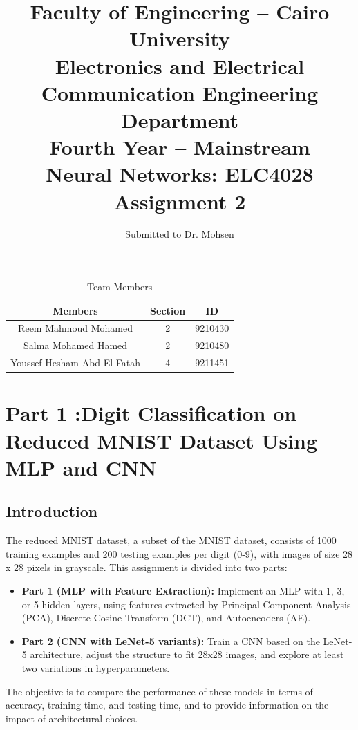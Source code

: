 \documentclass[a4paper,12pt]{article}
\title{Faculty of Engineering -- Cairo University \\ 
Electronics and Electrical Communication Engineering Department \\
Fourth Year -- Mainstream \\ 
Neural Networks: ELC4028 \\ 
Assignment 2}
\author{Submitted to Dr. Mohsen}
\date{}
\begin{document}
\maketitle

\begin{table}[h]
    \centering
    \begin{tabular}{ccc}
        \toprule
        \textbf{Members} & \textbf{Section} & \textbf{ID} \\
        \midrule
        Reem Mahmoud Mohamed & 2 & 9210430 \\
        Salma Mohamed Hamed & 2 & 9210480 \\
        Youssef Hesham Abd-El-Fatah & 4 & 9211451 \\
        \bottomrule
    \end{tabular}
    \caption{Team Members}
    \label{tab:team}
\end{table}


\newpage


\section{Part 1 :Digit Classification on Reduced MNIST Dataset Using MLP and CNN}

\subsection{Introduction}
The reduced MNIST dataset, a subset of the MNIST dataset, consists of 1000 training examples and 200 testing examples per digit (0-9), with images of size 28 x 28 pixels in grayscale. This assignment is divided into two parts:

\begin{itemize}
    \item \textbf{Part 1 (MLP with Feature Extraction):} Implement an MLP with 1, 3, or 5 hidden layers, using features extracted by Principal Component Analysis (PCA), Discrete Cosine Transform (DCT), and Autoencoders (AE).
    \item \textbf{Part 2 (CNN with LeNet-5 variants):} Train a CNN based on the LeNet-5 architecture, adjust the structure to fit 28x28 images, and explore at least two variations in hyperparameters.
\end{itemize}

The objective is to compare the performance of these models in terms of accuracy, training time, and testing time, and to provide information on the impact of architectural choices.
\end{document}
